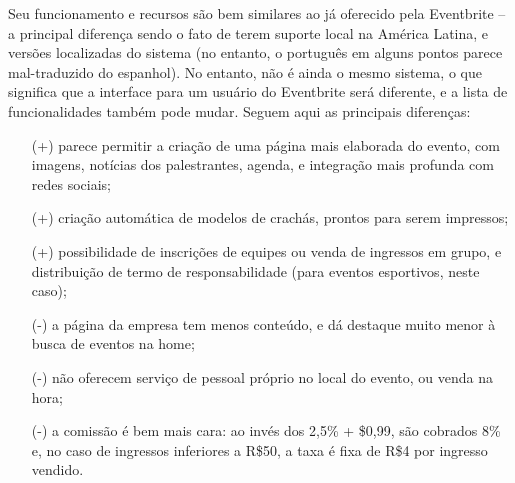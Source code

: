 \documentclass[12pt,a4paper,twoside,hyphens,english,brazil]{abntex2}
\begin{document}
Seu funcionamento e recursos são bem similares ao já oferecido pela Eventbrite -- a principal diferença sendo o fato de terem suporte local na América Latina, e versões localizadas do sistema (no entanto, o português em alguns pontos parece mal-traduzido do espanhol). No entanto, não é ainda o mesmo sistema, o que significa que a interface para um usuário do Eventbrite será diferente, e a lista de funcionalidades também pode mudar. Seguem aqui as principais diferenças:
\begin{itemize}[itemsep=-0.5ex]
	\item[(+)] parece permitir a criação de uma página mais elaborada do evento, com imagens, notícias dos palestrantes, agenda, e integração mais profunda com redes sociais;
	\item[(+)] criação automática de modelos de crachás, prontos para serem impressos;
	\item[(+)] possibilidade de inscrições de equipes ou venda de ingressos em grupo, e distribuição de termo de responsabilidade (para eventos esportivos, neste caso);
	\item[(-)] a página da empresa tem menos conteúdo, e dá destaque muito menor à busca de eventos na home;
	\item[(-)] não oferecem serviço de pessoal próprio no local do evento, ou venda na hora;
	\item[(-)] a comissão é bem mais cara: ao invés dos 2,5\% + \$0,99, são cobrados 8\% e, no caso de ingressos inferiores a R\$50, a taxa é fixa de R\$4 por ingresso vendido.
\end{itemize}
\end{document}
